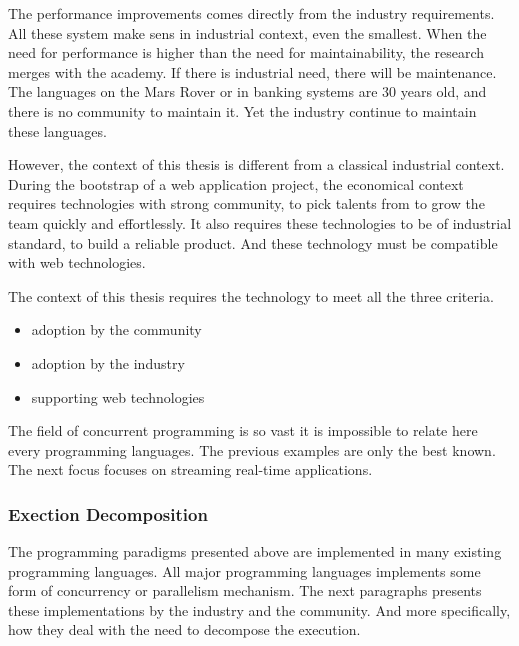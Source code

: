 The performance improvements comes directly from the industry requirements.
All these system make sens in industrial context, even the smallest.
When the need for performance is higher than the need for maintainability, the research merges with the academy.
If there is industrial need, there will be maintenance.
The languages on the Mars Rover or in banking systems are 30 years old, and there is no community to maintain it.
Yet the industry continue to maintain these languages.

However, the context of this thesis is different from a classical industrial context.
During the bootstrap of a web application project, the economical context requires technologies with strong community, to pick talents from to grow the team quickly and effortlessly.
It also requires these technologies to be of industrial standard, to build a reliable product.
And these technology must be compatible with web technologies.

The context of this thesis requires the technology to meet all the three criteria.
\begin{itemize}
\item adoption by the community
\item adoption by the industry
\item supporting web technologies
\end{itemize}


The field of concurrent programming is so vast it is impossible to relate here every programming languages.
The previous examples are only the best known.
The next focus focuses on streaming real-time applications.







\subsubsection{Exection Decomposition}


The programming paradigms presented above are implemented in many existing programming languages.
All major programming languages implements some form of concurrency or parallelism mechanism.
The next paragraphs presents these implementations by the industry and the community.
And more specifically, how they deal with the need to decompose the execution.


